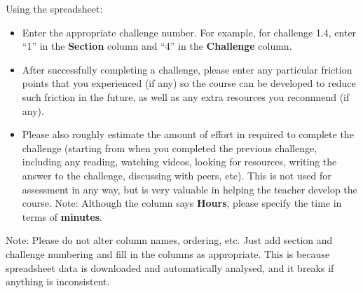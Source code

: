 Using the spreadsheet:

\begin{itemize}
    \item Enter the appropriate challenge number. For example, for challenge 1.4, enter ``1'' in the \textbf{Section} column and ``4'' in the \textbf{Challenge} column.
    \item After successfully completing a challenge, please enter any particular friction points that you experienced (if any) so the course can be developed to reduce such friction in the future, as well as any extra resources you recommend (if any).
    \item Please also roughly estimate the amount of effort in required to complete the challenge (starting from when you completed the previous challenge, including any reading, watching videos, looking for resources, writing the answer to the challenge, discussing with peers, etc). This is not used for assessment in any way, but is very valuable in helping the teacher develop the course. Note: Although the column says \textbf{Hours}, please specify the time in terms of \textbf{minutes}.
\end{itemize}

Note: Please do not alter column names, ordering, etc. Just add section and challenge numbering and fill in the columns as appropriate. This is because spreadsheet data is downloaded and automatically analysed, and it breaks if anything is inconsistent.
